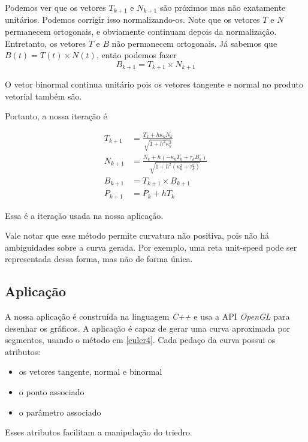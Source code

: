 \documentclass{article}
\begin{document}
Podemos ver que os vetores $T_{k + 1}$ e $N_{k + 1}$ são próximos mas não exatamente unitários. Podemos corrigir isso normalizando-os. Note que os vetores $T$ e $N$ permanecem ortogonais, e obviamente continuam depois da normalização. Entretanto, os vetores $T$ e $B$ não permanecem ortogonais. Já sabemos que $B(t) = T(t) \times N(t)$, então podemos fazer 
\[B_{k + 1} = T_{k + 1} \times N_{k + 1}\]

O vetor binormal continua unitário pois os vetores tangente e normal no produto vetorial também são.

Portanto, a nossa iteração é

\begin{equation}
    \begin{split}
        T_{k + 1} & = \frac{T_k + h\kappa_k N_k}{\sqrt{1 + h^2\kappa_k^2}} \\
        N_{k + 1} & = \frac{N_k + h(-\kappa_k T_k + \tau_k B_k)}{\sqrt{1 + h^2(\kappa_k^2 + \tau_k^2)}} \\
        B_{k + 1} & = T_{k + 1} \times B_{k + 1} \\
        P_{k + 1} & = P_k + hT_k
    \end{split}
    \label{euler4}
\end{equation}

Essa é a iteração usada na nossa aplicação.

Vale notar que esse método permite curvatura não positiva, pois não há ambiguidades sobre a curva gerada. Por exemplo, uma reta unit-speed pode ser representada dessa forma, mas não de forma única.

\subsection{Aplicação}

A nossa aplicação é construída na linguagem \textit{C++} e usa a API \textit{OpenGL} para desenhar os gráficos. A aplicação é capaz de gerar uma curva aproximada por segmentos, usando o método em \ref{euler4}. Cada pedaço da curva possui os atributos: 

\begin{itemize}
    \item
        os vetores tangente, normal e binormal
        
    \item
        o ponto associado
        
    \item
        o parâmetro associado
\end{itemize}
Esses atributos facilitam a manipulação do triedro.
\end{document}
